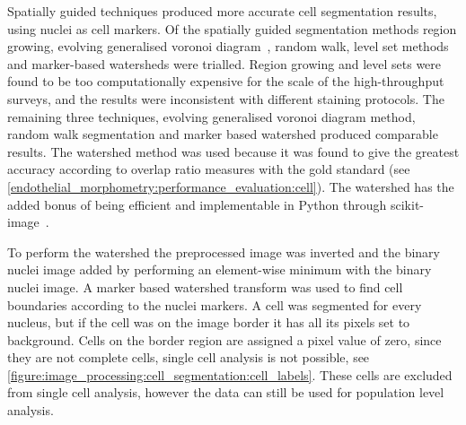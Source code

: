 Spatially guided techniques produced more accurate cell segmentation results, using nuclei as cell markers. Of the spatially guided segmentation methods region growing, evolving generalised voronoi diagram~\cite{Yu2010}, random walk, level set methods and marker-based watersheds were trialled. Region growing and level sets were found to be too computationally expensive for the scale of the high-throughput surveys, and the results were inconsistent with different staining protocols. The remaining three techniques, evolving generalised voronoi diagram method, random walk segmentation and marker based watershed produced comparable results. The watershed method was used because it was found to give the greatest accuracy according to overlap ratio measures with the gold standard (see \autoref{endothelial_morphometry:performance_evaluation:cell}). The watershed has the added bonus of being efficient and implementable in Python through scikit-image~\cite{VanderWalt2014}.

To perform the watershed the preprocessed image was inverted and the binary nuclei image added by performing an element-wise minimum with the binary nuclei image. A marker based watershed transform was used to find cell boundaries according to the nuclei markers. A cell was segmented for every nucleus, but if the cell was on the image border it has all its pixels set to background. Cells on the border region are assigned a pixel value of zero, since they are not complete cells, single cell analysis is not possible, see \autoref{figure:image_processing:cell_segmentation:cell_labels}. These cells are excluded from single cell analysis, however the data can still be used for population level analysis.


